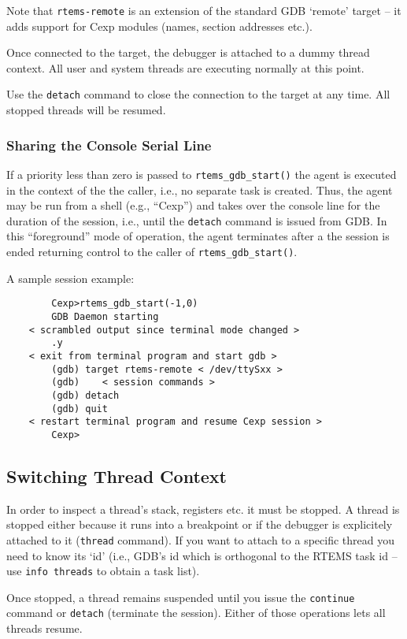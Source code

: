 \documentclass{article}
\newcommand{\cmd}[1]{{\tt #1}}
\begin{document}
	Note that \cmd{rtems-remote} is an extension of the
	standard GDB `remote' target -- it adds support
	for Cexp modules (names, section addresses etc.).

	Once connected to the target, the debugger is
	attached to a dummy thread context. All user and
	system threads are executing normally at this point.

	Use the \cmd{detach} command to close the connection
	to the target at any time. All stopped threads will
	be resumed.

\subsubsection{Sharing the Console Serial Line}
	If a priority less than zero is passed to {\verb|rtems_gdb_start()|}
    the agent is executed in the context of the the caller, i.e.,
    no separate task is created. Thus, the agent may be run from
    a shell (e.g., ``Cexp'') and takes over the console line for
    the duration of the session, i.e., until the \cmd{detach}
    command is issued from GDB. In this ``foreground'' mode
    of operation, the agent terminates after a the session is ended
    returning control to the caller of {\verb|rtems_gdb_start()|}.

	A sample session example:
\begin{verbatim}
	    Cexp>rtems_gdb_start(-1,0)
	    GDB Daemon starting
	< scrambled output since terminal mode changed >
	    .y
	< exit from terminal program and start gdb >
	    (gdb) target rtems-remote < /dev/ttySxx >
	    (gdb)    < session commands >
	    (gdb) detach
	    (gdb) quit
	< restart terminal program and resume Cexp session >
	    Cexp>
\end{verbatim}

\subsection{Switching Thread Context}
	In order to inspect a thread's stack, registers etc.
	it must be stopped.
	A thread is stopped either because it runs into a
	breakpoint or if the debugger is explicitely
	attached to it (\cmd{thread} command). If you want to attach
	to a specific thread you need to know its `id'
	(i.e., GDB's id which is orthogonal to the RTEMS task id
	-- use \cmd{info threads} to obtain a task list).

	Once stopped, a thread remains suspended until you
	issue the \cmd{continue} command or \cmd{detach} (terminate
	the session). Either of those operations lets all threads resume.
\end{document}
